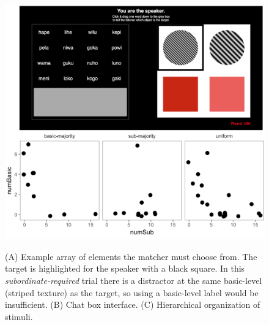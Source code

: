 \documentclass{evolang12}
\begin{document}
\begin{figure}[t]
\begin{center}
{\caption{{\footnotesize (A) Example array of elements the matcher must choose from. The target is highlighted for the speaker with a black square. In this \emph{subordinate-required} trial there is a distractor at the same basic-level (striped texture) as the target, so using a basic-level label would be insufficient. (B) Chat box interface. (C) Hierarchical organization of stimuli.  \label{exp}}}}
{\includegraphics[scale=.41]{fig.png}}
\end{center}
\end{figure}

\newpage


 
\end{document}
